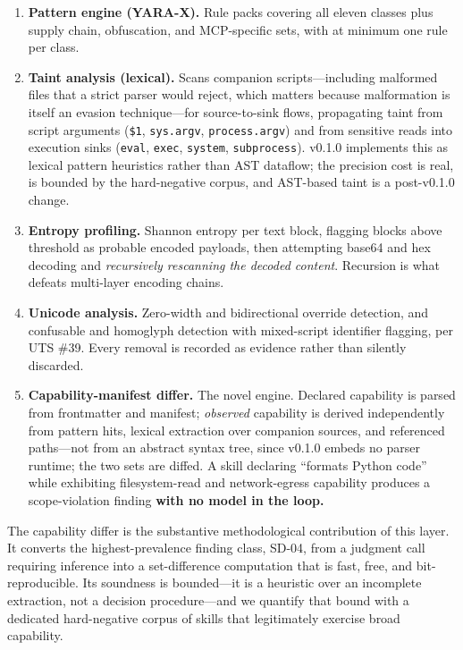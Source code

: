 \documentclass[11pt]{article}
\begin{document}
\begin{enumerate}[leftmargin=*,itemsep=3pt]
  \item \textbf{Pattern engine (YARA-X).} Rule packs covering all eleven
  classes plus supply chain, obfuscation, and MCP-specific sets, with at
  minimum one rule per class.
  \item \textbf{Taint analysis (lexical).} Scans companion scripts---including
  malformed files that a strict parser would reject, which matters because
  malformation is itself an evasion technique---for source-to-sink flows,
  propagating taint from script arguments (\texttt{\$1}, \texttt{sys.argv},
  \texttt{process.argv}) and from sensitive reads into execution sinks
  (\texttt{eval}, \texttt{exec}, \texttt{system}, \texttt{subprocess}). v0.1.0
  implements this as lexical pattern heuristics rather than AST dataflow; the
  precision cost is real, is bounded by the hard-negative corpus, and
  AST-based taint is a post-v0.1.0 change.
  \item \textbf{Entropy profiling.} Shannon entropy per text block, flagging
  blocks above threshold as probable encoded payloads, then attempting base64
  and hex decoding and \emph{recursively rescanning the decoded content}.
  Recursion is what defeats multi-layer encoding chains.
  \item \textbf{Unicode analysis.} Zero-width and bidirectional override
  detection, and confusable and homoglyph detection with mixed-script
  identifier flagging, per UTS \#39. Every removal is recorded as evidence
  rather than silently discarded.
  \item \textbf{Capability-manifest differ.} The novel engine. Declared
  capability is parsed from frontmatter and manifest; \emph{observed}
  capability is derived independently from pattern hits, lexical extraction
  over companion sources, and referenced paths---not from an abstract syntax
  tree, since v0.1.0 embeds no parser runtime; the two sets are diffed. A skill
  declaring ``formats Python code'' while exhibiting filesystem-read and
  network-egress capability produces a scope-violation finding \textbf{with no
  model in the loop.}
\end{enumerate}

The capability differ is the substantive methodological contribution of this
layer. It converts the highest-prevalence finding class, SD-04, from a judgment
call requiring inference into a set-difference computation that is fast, free,
and bit-reproducible. Its soundness is bounded---it is a heuristic over an
incomplete extraction, not a decision procedure---and we quantify that bound
with a dedicated hard-negative corpus of skills that legitimately exercise
broad capability.
\end{document}
